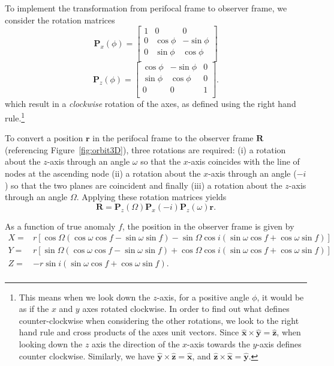 \documentclass[modern]{aastex62}
\begin{document}
To implement the transformation from perifocal frame to observer frame, we consider the rotation matrices
\begin{equation}
  \boldsymbol{P}_x(\phi) = \left [
  \begin{array}{ccc}
    1 & 0 & 0 \\
    0 & \cos \phi & - \sin \phi \\
    0 & \sin \phi & \cos \phi \\
    \end{array}\right]
\end{equation}
\begin{equation}
  \boldsymbol{P}_z (\phi) = \left [
  \begin{array}{ccc}
    \cos \phi & - \sin \phi & 0\\
    \sin \phi & \cos \phi & 0 \\
    0 & 0 & 1 \\
    \end{array}\right].
\end{equation}
which result in a \emph{clockwise} rotation of the axes, as defined using the right hand rule.\footnote{This means when we look down the $z$-axis, for a positive angle $\phi$, it would be as if the $x$ and $y$ axes rotated clockwise.
In order to find out what defines counter-clockwise when considering the other rotations, we look to the right hand rule and cross products of the axes unit vectors. Since $\hat{\bm x} \times \hat{\bm y} = \hat{\bm z}$, when looking down the $z$ axis the direction of the $x$-axis towards the $y$-axis defines counter clockwise.
Similarly, we have $\hat{{\bm y}} \times \hat{{\bm z}} = \hat{{\bm x}}$, and $\hat{{\bm z}} \times \hat{{\bm x}} = \hat{{\bm y}}$.}

To convert a position $\boldsymbol{r}$ in the perifocal frame to the observer frame $\boldsymbol{R}$ (referencing Figure~\ref{fig:orbit3D}), three rotations are required: (i) a rotation about the $z$-axis through an angle $\omega$ so that the $x$-axis coincides with the line of nodes at the ascending node (ii) a rotation about the $x$-axis through an angle ($-i$) so that the two planes are coincident and finally (iii) a rotation about the $z$-axis through an angle $\Omega$. Applying these rotation matrices yields
\begin{equation}
  \boldsymbol{R} =
  \boldsymbol{P}_z (\Omega) \boldsymbol{P}_x(-i) \boldsymbol{P}_z(\omega)
  \boldsymbol{r}.
\end{equation}

As a function of true anomaly $f$, the position in the observer frame is given by
\begin{equation}
  \begin{array}{lc}
    X =& r [ \cos \Omega (\cos \omega \cos f - \sin \omega \sin f)  - \sin \Omega  \cos i (\sin \omega \cos f + \cos \omega \sin f) ] \\
    Y =& r [ \sin \Omega (\cos \omega \cos f - \sin \omega \sin f) + \cos \Omega \cos i(\sin \omega \cos f + \cos \omega \sin f) ] \\
    Z =& - r \sin i (\sin \omega \cos f + \cos \omega \sin f).\\
\end{array}
\label{eqn:Z}
\end{equation}
\end{document}
